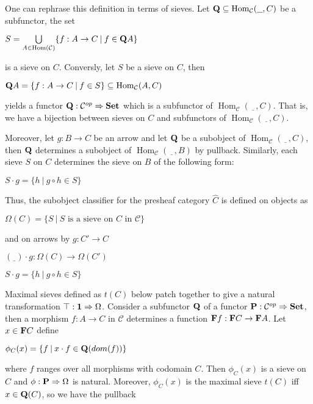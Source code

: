 \documentclass[a4paper]{article}
\theoremstyle{defin}
\theoremstyle{theorem}
\theoremstyle{claim}
\theoremstyle{prop}
\theoremstyle{lemma}
\theoremstyle{fact}
\theoremstyle{ex}
\theoremstyle{col}
\begin{document}
One can rephrase this definition in terms of sieves. Let ${\bf Q} \subseteq \operatorname{Hom}_{\mathcal{C}}(\underline{\:\:\:}, C)$ be a subfunctor, the set
\begin{center}
$S = \bigcup \limits_{A \in \operatorname{Hom}(\mathcal{C})} \{ f : A \to C \: | \: f \in {\bf Q}A \}$
\end{center}
is a sieve on $C$. Conversly, let $S$ be a sieve on $C$, then
\begin{center}
${\bf Q}A = \{ f : A \to C \: | \: f \in S \} \subseteq \operatorname{Hom}_{\mathcal{C}}(A, C)$
\end{center}
yields a functor ${\bf Q} : \mathcal{C}^{op} \Rightarrow {\bf Set}$ which is a subfunctor of $\operatorname{Hom}_{\mathcal{C}}(\underline{\:\:\:}, C)$.
That is, we have a bijection between sieves on $C$ and subfunctors of $\operatorname{Hom}_{\mathcal{C}}(\underline{\:\:\:}, C)$.

Moreover, let $g : B \to C$ be an arrow and let ${\bf Q}$ be a subobject of $\operatorname{Hom}_{\mathcal{C}}(\underline{\:\:\:}, C)$, then ${\bf Q}$ determines a subobject of $\operatorname{Hom}_{\mathcal{C}}(\underline{\:\:\:}, B)$ by pullback. Similarly, each sieve $S$ on $C$ determines the sieve on $B$ of the following form:
\begin{center}
$S \cdot g = \{ h \: | \: g \circ h \in S \}$
\end{center}

Thus, the subobject classifier for the presheaf category $\widehat{C}$ is defined on objects as
\begin{center}
$\Omega(C) = \{ S \: | \: \text{$S$ is a sieve on $C$ in $\mathcal{C}$}\}$
\end{center}
and on arrows by $g : C' \to C$
\begin{center}
$(\underline{\:\:}) \cdot g : \Omega(C) \rightarrow \Omega(C')$

$S \cdot g = \{ h \: | \: g \circ h \in S \}$
\end{center}

Maximal sieves defined as $t(C)$ below patch together to give a natural transformation $\top : {\bf 1} \Rightarrow \Omega$. Consider a subfunctor ${\bf Q}$ of a functor ${\bf P} : \mathcal{C}^{op} \Rightarrow {\bf Set}$, then a morphism $f : A \to C$ in $\mathcal{C}$ determines a function ${\bf F} f : {\bf F} C \to {\bf F} A$. Let $x \in {\bf F} C$ define
\begin{center}
$\phi_C(x) = \{ f \: | \: x \cdot f \in {\bf Q}(dom(f))\}$
\end{center}
where $f$ ranges over all morphisms with codomain $C$. Then $\phi_C(x)$ is a sieve on $C$ and $\phi : {\bf P} \Rightarrow \Omega$ is natural. Moreover, $\phi_C(x)$ is the maximal sieve $t(C)$ iff $x \in {\bf Q}(C)$, so we have the pullback
\end{document}
